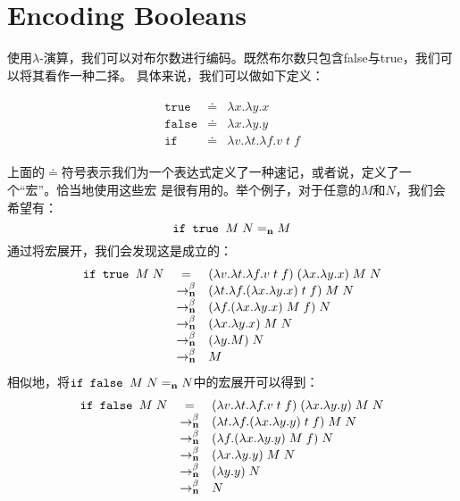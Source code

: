 \documentclass[12pt]{article}
\begin{document}
\section{Encoding Booleans}
\indent{}使用$\lambda$-演算，我们可以对布尔数进行编码。既然布尔数只包含false与true，我们可以将其看作一种二择。
具体来说，我们可以做如下定义：
\begin{tcolorbox}[top=-0.8em,left=0mm,right=0mm]
\begin{gather*}
\begin{array}{lll}
\texttt{true}  & \doteq & \lambda x.\lambda y.x\\
\texttt{false} & \doteq & \lambda x.\lambda y.y\\
\texttt{if}    & \doteq & \lambda v.\lambda t.\lambda f. v\; t\; f
\end{array}
\end{gather*}
\end{tcolorbox}
\noindent{}上面的$\doteq$符号表示我们为一个表达式定义了一种速记，或者说，定义了一个“宏”。恰当地使用这些宏
是很有用的。举个例子，对于任意的$M$和$N$，我们会希望有：
\begin{displaymath}
\texttt{if true }M\; N =_{\bf{n}} M
\end{displaymath}
\noindent{}通过将宏展开，我们会发现这是成立的：
\begin{gather*}
\begin{array}{lcl}
\texttt{if true }M\; N
& = & (\lambda v.\lambda t. \lambda f.v\;t\;f)\;(\lambda x.\lambda y.x)\;M\;N\\
& \rightarrow_{\bf{n}}^{\beta} & (\lambda t.\lambda f.(\lambda x.\lambda y.x)\;t\;f)\;M\;N\\
& \rightarrow_{\bf{n}}^{\beta} & (\lambda f.(\lambda x.\lambda y.x)\;M\;f)\;N\\
& \rightarrow_{\bf{n}}^{\beta} & (\lambda x.\lambda y.x)\;M\;N\\
& \rightarrow_{\bf{n}}^{\beta} & (\lambda y.M)\;N\\
& \rightarrow_{\bf{n}}^{\beta} & M
\end{array}
\end{gather*}
\noindent{}相似地，将$\texttt{if false }M\;N =_{\bf{n}} N$中的宏展开可以得到：
\begin{gather*}
\begin{array}{lcl}
\texttt{if false }M\; N
& = & (\lambda v.\lambda t. \lambda f.v\;t\;f)\;(\lambda x.\lambda y.y)\;M\;N\\
& \rightarrow_{\bf{n}}^{\beta} & (\lambda t.\lambda f.(\lambda x.\lambda y.y)\;t\;f)\;M\;N\\
& \rightarrow_{\bf{n}}^{\beta} & (\lambda f.(\lambda x.\lambda y.y)\;M\;f)\;N\\
& \rightarrow_{\bf{n}}^{\beta} & (\lambda x.\lambda y.y)\;M\;N\\
& \rightarrow_{\bf{n}}^{\beta} & (\lambda y.y)\;N\\
& \rightarrow_{\bf{n}}^{\beta} & N
\end{array}
\end{gather*}
\end{document}

